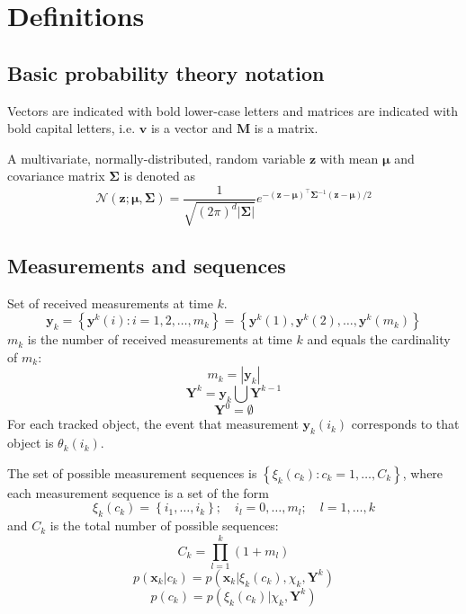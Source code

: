\section{Definitions}
\subsection{Basic probability theory notation}
Vectors are indicated with bold lower-case letters and matrices are indicated with bold capital letters, i.e. $\mathbf v$ is a vector and $\mathbf M$ is a matrix.

A multivariate, normally-distributed, random variable $\mathbf z$ with mean $\mathbf \mu$ and covariance matrix $\mathbf \Sigma$ is denoted as
\begin{equation}
    \mathcal N(\mathbf z; \bm \mu, \mathbf \Sigma) = \frac{1}{\sqrt{(2\pi)^{d} \mathbf |\mathbf \Sigma|}}e^{-(\mathbf z - \bm{\mu})^\intercal \mathbf \Sigma^{-1} (\mathbf z - \bm \mu)/2}
\end{equation}

\subsection{Measurements and sequences}
Set of received measurements at time $k$.
\begin{equation}
    \mathbf y_k = \left\{ \mathbf y^k (i): i=1,2,\dots,m_k\right\} = \left\{ \mathbf y^k(1) , \mathbf y^k(2),\dots,\mathbf y^k(m_k)\right\}
\end{equation}
$m_k$ is the number of received measurements at time $k$ and equals the cardinality of $m_k$:
\begin{equation}
    m_k = \left| \mathbf y_k\right|
\end{equation}
\begin{equation}
    \label{eq:measurement-sequence}
    \mathbf Y^k = \mathbf y_k \bigcup \mathbf Y^{k-1}
\end{equation}
\begin{equation}
    \mathbf Y^0 = \emptyset
\end{equation}
For each tracked object, the event that measurement $\mathbf y_k(i_k)$ corresponds to that object is $\theta_k(i_k)$.

The set of possible measurement sequences is $\left\{ \xi_k(c_k): c_k = 1,\dots,C_k\right\}$, where each measurement sequence is a
set of the form
\begin{equation}
    \xi_k(c_k) = \left\{ i_1, \dots, i_k \right\};\quad i_l = 0,\dots, m_l;\quad l = 1,\dots, k
\end{equation}
and $C_k$ is the total number of possible sequences:
\begin{equation}
    C_k = \prod^k_{l=1}(1+m_l)
\end{equation}
\begin{equation}
    p(\mathbf x_k | c_k) = p(\mathbf x_k| \xi_k(c_k),\chi_k, \mathbf Y^k)
\end{equation}
\begin{equation}
    p(c_k) = p(\xi_k(c_k)|\chi_k, \mathbf Y^k)
\end{equation}


